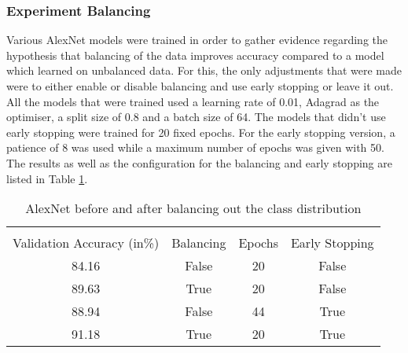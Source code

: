 \subsubsection{Experiment Balancing}\label{balancingexperiment}
Various AlexNet models were trained in order to gather evidence regarding the hypothesis that balancing of the data improves accuracy compared to a model which learned on unbalanced data. For this, the only adjustments that were made were to either enable or disable balancing and use early stopping or leave it out. All the models that were trained used a learning rate of 0.01, Adagrad as the optimiser, a split size of 0.8 and a batch size of 64. The models that didn't use early stopping were trained for 20 fixed epochs. For the early stopping version, a patience of 8 was used while a maximum number of epochs was given with 50. The results as well as the configuration for the balancing and early stopping are listed in Table \ref{balancing-table}. 
\begin{table}[h]
	\caption{AlexNet before and after balancing out the class distribution}\label{balancing-table}
	\centering
	\begin{tabular}{cccc}
		\toprule
		\multicolumn{3}{c}{} \\
		Validation Accuracy (in\%)    & Balancing     & Epochs    &Early Stopping     \\
		\midrule
		84.16    &    False    & 20    & False \\
		89.63    &    True    & 20    & False  \\
		88.94    &    False   & 44    & True \\
		91.18    &    True    & 20    & True \\
		\bottomrule
	\end{tabular}
\end{table}
